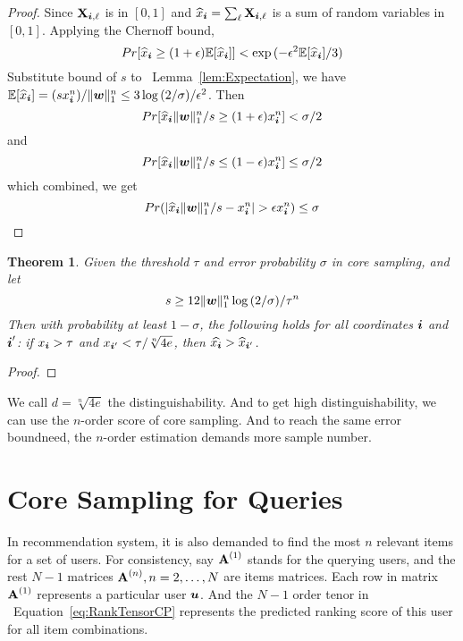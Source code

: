 \documentclass[letterpaper]{article}
\newcommand{\V}[1]{{\bm{{\MakeLowercase{#1}}}}}
\newcommand{\M}[1]{{\bm{\mathbf{\MakeUppercase{#1}}}}}
\newcommand{\norm}[2]{\|#1\|_{#2}}
\newcommand{\Eqn}[1]   {Equation~\ref{eq:#1}}
\newcommand{\Lem}[1]  {Lemma~\ref{lem:#1}}
\newcommand{\predx}{\widehat{x}_{\V{i}}}
\newtheorem{theorem}{Theorem}
\begin{document}
\begin{proof}
Since $\M{X}_{\V{i},\ell}$ is in $[0,1]$
and $\predx=\sum_{\ell}\M{X}_{\V{i},\ell}$ is a sum of random variables in $[0,1]$.
Applying the Chernoff bound,
\[
    Pr[\predx \geq (1+\epsilon)\mathbb{E}[\predx]] < \exp{(-\epsilon^2\mathbb{E}[\predx]/3)}
\]
Substitute bound of $s$ to ~\Lem{Expectation}, we have
$\mathbb{E}[\predx]=(sx^n_{\V{i}})/\norm{\V{W}}{1}^n \leq 3\log{(2/\sigma)/\epsilon^2}$.
Then
\[
    Pr[\predx\norm{\V{W}}{1}^n/s \geq (1+\epsilon) x^n_{\V{i}}] < \sigma/2
\]
and
\[
    Pr[\predx\norm{\V{W}}{1}^n/s \leq (1-\epsilon) x^n_{\V{i}}] \leq \sigma/2
\]
which combined, we get
\[
    Pr(|\predx\norm{\V{W}}{1}^n/s - x^n_{\V{i}}| > \epsilon x^n_{\V{i}}) \leq \sigma
\]
\end{proof}

\begin{theorem}\label{theo:Order}
Given the threshold $\tau$ and error probability $\sigma$ in core sampling,
and let
\[
    s \geq 12\norm{\V{w}}{1}^n\log{(2/\sigma)}/\tau^n
\]
Then with probability at least $1-\sigma$,
the following holds for all coordinates $\V{i}$
and $\V{i}'$:
if $x_{\V{i}} > \tau$ and $x_{\V{i}'} < \tau/\sqrt[n]{4e}$,
then $\widehat{x_{\V{i}}} > \widehat{x}_{\V{i}'}$.
\end{theorem}

\begin{proof}

\end{proof}
We call $d=\sqrt[n]{4e}$ the distinguishability.
And to get high distinguishability,
we can use the $n$-order score of core sampling.
And to reach the same error boundneed,
the $n$-order estimation demands more sample number.

\section{Core Sampling for Queries}
In recommendation system,
it is also demanded to find the most $n$ relevant items for a set of users.
For consistency,
say $\M{A}^{(1)}$ stands for the querying users,
and the rest $N-1$ matrices $\M{A}^{(n)},n=2,\ldots,N$ are items matrices.
Each row in matrix $\M{A}^{(1)}$ represents a particular user $\V{u}$.
And the $N-1$ order tenor in ~\Eqn{RankTensorCP}
represents the predicted ranking score of this user for all item combinations.
\end{document}

